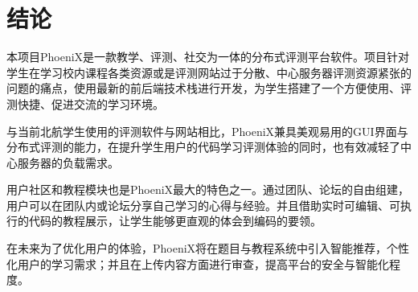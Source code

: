 
\chapter*{结论}
本项目PhoeniX是一款教学、评测、社交为一体的分布式评测平台软件。项目针对学生在学习校内课程各类资源或是评测网站过于分散、中心服务器评测资源紧张的问题的痛点，使用最新的前后端技术栈进行开发，为学生搭建了一个方便使用、评测快捷、促进交流的学习环境。

与当前北航学生使用的评测软件与网站相比，PhoeniX兼具美观易用的GUI界面与分布式评测的能力，在提升学生用户的代码学习评测体验的同时，也有效减轻了中心服务器的负载需求。

用户社区和教程模块也是PhoeniX最大的特色之一。通过团队、论坛的自由组建，用户可以在团队内或论坛分享自己学习的心得与经验。并且借助实时可编辑、可执行的代码的教程展示，让学生能够更直观的体会到编码的要领。

在未来为了优化用户的体验，PhoeniX将在题目与教程系统中引入智能推荐，个性化用户的学习需求；并且在上传内容方面进行审查，提高平台的安全与智能化程度。

\par
